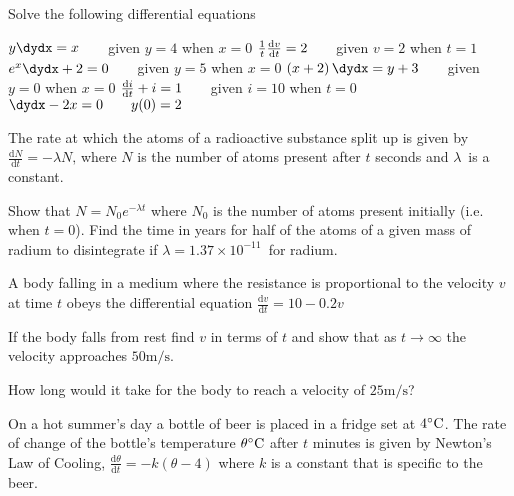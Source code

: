 
\begin{Exercise}[title={Separable Equations},label=exSepEqns]
	\Question Solve the following differential equations  
	\begin{tasks}
		\task  $y \dydx =x\text{\quad \quad }$given $y =4$ when $x =0$ %
		\task $\frac{1}{t} \frac{\mathrm{d} v}{\mathrm{d} t} =2\text{\quad \quad }$given $v =2$ when $t =1$ %
		\task $e^{x} \dydx +2 =0\text{\quad \quad }$given $y =5$ when $x =0$ %
		\task $\left (x +2\right ) \dydx =y +3\text{\quad \quad }$given $y =0$ when $x =0$ %
		\task $\frac{\mathrm{d} i}{\mathrm{d} t} +i =1\text{\quad \quad }$given $i =10$ when $t =0$ %
		\task $\dydx -2 x =0\text{\quad \quad }y (0) =2$ %
	\end{tasks}
	

\Question The rate at which the atoms of a radioactive substance split up is given by $\frac{\mathrm{d} N}{\mathrm{d} t} = -\lambda  N\text{,}$ where $N$ is the number of atoms present after $t$ seconds and $\lambda $\ is a constant. 
\begin{tasks}
	\task Show that $N =N_{0} e^{ -\lambda  t}$ where $N_{0}$ is the number of atoms present initially (i.e. when $t =0$). 
	\task Find the time in years for half of the atoms of a given mass of
	radium to disintegrate if $\lambda  =1.37 \times 10^{ -11}$\ for radium. 
\end{tasks}

\Question A body falling in a medium where the resistance is proportional to the velocity $v$ at time $t$ obeys the differential equation $\frac{\mathrm{d} v}{\mathrm{d} t} =10 -0.2 v$ 
\begin{tasks}
	\task If the body falls from rest find $v$ in terms of $t$ and show that as $t \rightarrow \infty $ the velocity approaches $50 \mathrm{m}/\mbox{s}$. 
	
	\task How long would it take for the body to reach a velocity of $25 \mathrm{m}/\mbox{s}$? \end{tasks}

\Question On a hot summer's day a bottle of beer is placed in a fridge set at $4 \mbox{{\ensuremath{{}^\circ}}C}$.  The rate of change of the bottle's temperature $\theta  \mbox{{\ensuremath{{}^\circ}}C}$ after $t$ minutes is given by Newton's Law of Cooling, $\frac{\mathrm{d} \theta }{\mathrm{d} t} = -k \left (\theta  -4\right )$ where $k$ is a constant that is specific to the beer. 


\end{Exercise}
